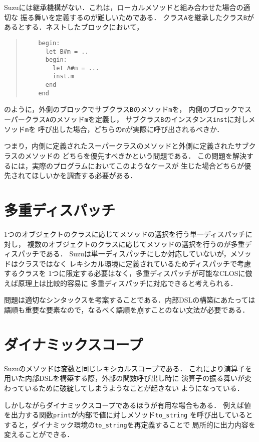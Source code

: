 \documentclass[a4paper,11pt,dvipdfmx]{jreport}
\begin{document}
Suzuには継承機構がない．これは，ローカルメソッドと組み合わせた場合の適切な
振る舞いを定義するのが難しいためである．
クラス\verb|A|を継承したクラス\verb|B|があるとする．ネストしたブロックにおいて，
\begin{quote}
	\begin{verbatim}
	begin:
	  let B#m = ..
	  begin:
	    let A#m = ...
	    inst.m
	  end
	end
	\end{verbatim}
\end{quote}
のように，外側のブロックでサブクラス\verb|B|のメソッド\verb|m|を，
内側のブロックでスーパークラス\verb|A|のメソッド\verb|m|を定義し，
サブクラス\verb|B|のインスタンス\verb|inst|に対しメソッド\verb|m|を
呼び出した場合，どちらの\verb|m|が実際に呼び出されるべきか．

つまり，内側に定義されたスーパークラスのメソッドと外側に定義されたサブクラスのメソッドの
どちらを優先すべきかという問題である．
この問題を解決するには，実際のプログラムにおいてこのようなケースが
生じた場合どちらが優先されてほしいかを調査する必要がある．


\section{多重ディスパッチ}

1つのオブジェクトのクラスに応じてメソッドの選択を行う単一ディスパッチに対し，
複数のオブジェクトのクラスに応じてメソッドの選択を行うのが多重ディスパッチである．
Suzuは単一ディスパッチにしか対応していないが，メソッドはクラスではなく
レキシカル環境に定義されているためディスパッチで考慮するクラスを
1つに限定する必要はなく，多重ディスパッチが可能なCLOSに倣えば原理上は比較的容易に
多重ディスパッチに対応できると考えられる．

問題は適切なシンタックスを考案することである．内部DSLの構築にあたっては
語順も重要な要素なので，なるべく語順を崩すことのない文法が必要である．

\section{ダイナミックスコープ}

Suzuのメソッドは変数と同じレキシカルスコープである．
これにより演算子を用いた内部DSLを構築する際，外部の関数呼び出し時に
演算子の振る舞いが変わっているために破綻してしまうようなことが起きない
ようになっている．

しかしながらダイナミックスコープであるほうが有用な場合もある．
例えば値を出力する関数\verb|print|が内部で値に対しメソッド\verb|to_string|
を呼び出しているとすると，ダイナミック環境の\verb|to_string|を再定義することで
局所的に出力内容を変えることができる．
\end{document}
